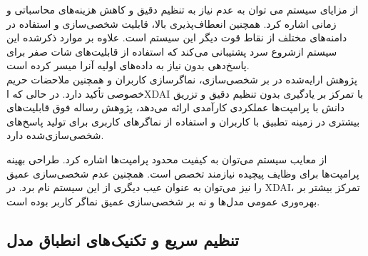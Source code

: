 از مزایای سیستم %
\cite{yu2022xdai}
 می توان به عدم نیاز به تنظیم دقیق و کاهش هزینه‌های محاسباتی و زمانی اشاره کرد. همچنین انعطاف‌پذیری بالا، قابلیت شخصی‌سازی و استفاده در دامنه‌های مختلف از نقاط قوت دیگر این سیستم است. علاوه بر موارد ذکرشده این سیستم ازشروع سرد پشتیبانی می کند که استفاده از قابلیت‌های شات صفر برای پاسخ‌دهی بدون نیاز به داده‌های اولیه آنرا میسر کرده است.\\

پژوهش ارایه‌شده در%
\cite{yu2022xdai}
 بر شخصی‌سازی، نماگر‌سازی کاربران و همچنین ملاحضات حریم خصوصی تأکید دارد. در حالی که اXDAI با تمرکز بر یادگیری بدون تنظیم دقیق و تزریق دانش با پرامپت‌ها عملکردی کارآمدی ارائه می‌دهد، پژوهش رساله فوق قابلیت‌های بیشتری در زمینه تطبیق با کاربران و استفاده از نماگر‌های کاربری برای تولید پاسخ‌های شخصی‌سازی‌شده دارد.

از معایب سیستم%
\cite{yu2022xdai}
می‌توان به کیفیت محدود پرامپت‌ها اشاره کرد. طراحی بهینه پرامپت‌ها برای وظایف پیچیده نیازمند تخصص است. همچنین عدم شخصی‌سازی عمیق را نیز می‌توان به عنوان عیب دیگری از این سیستم نام برد. در XDAI، تمرکز بیشتر بر بهره‌وری عمومی مدل‌ها و نه بر شخصی‌سازی عمیق نماگر کاربر بوده است.


\subsection{تنظیم سریع و تکنیک های انطباق مدل}

